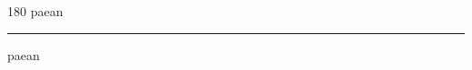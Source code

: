 
\begin{frame}
\begin{center}
\begin{turn}{180}
{\fontsize{2.5cm}{1em}\selectfont paean}
\end{turn}
\vspace{1em}\par  
\hrule
\vspace{1em}\par  
{\fontsize{2.5cm}{1em}\selectfont paean}
\end{center}
\end{frame}
